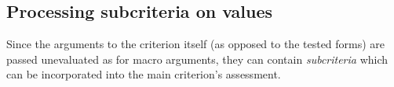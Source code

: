 % 
% 
% 

\subsection{Processing subcriteria on values}
\label{sec:subcriteria-values}
Since the arguments to the criterion itself (as opposed to the tested
forms) are passed unevaluated as for macro arguments, they can contain
\emph{subcriteria} which can be incorporated into the main criterion's
assessment.

